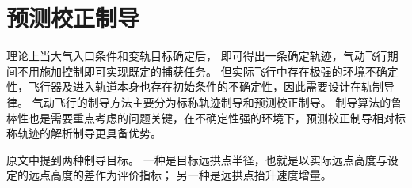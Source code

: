 \section{预测校正制导}
理论上当大气入口条件和变轨目标确定后，
即可得出一条确定轨迹，气动飞行期间不用施加控制即可实现既定的捕获任务。
但实际飞行中存在极强的环境不确定性，飞行器及进入轨道本身也存在初始条件的不确定性，因此需要设计在轨制导律。
气动飞行的制导方法主要分为标称轨迹制导和预测校正制导。
制导算法的鲁棒性也是需要重点考虑的问题关键，在不确定性强的环境下，预测校正制导相对标称轨迹的解析制导更具备优势\cite{dqingyuan2019}。

原文中提到两种制导目标。
一种是目标远拱点半径，也就是以实际远点高度与设定的远点高度的差作为评价指标；
另一种是远拱点抬升速度增量。
